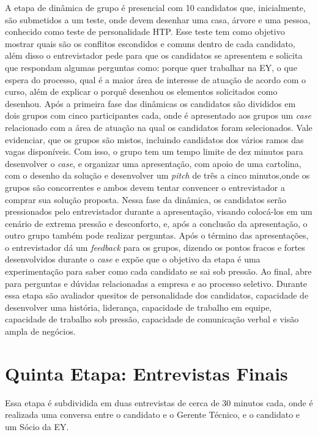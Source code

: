 A etapa de dinâmica de grupo é presencial com 10 candidatos que, inicialmente, são submetidos a um teste, onde devem desenhar uma casa, árvore e uma pessoa, conhecido como teste de personalidade HTP.
Esse teste tem como objetivo mostrar quais são os conflitos escondidos e comuns dentro de cada candidato, além disso o entrevistador pede para que os candidatos se apresentem e solicita que respondam algumas perguntas como: porque quer trabalhar na EY, o que espera do processo, qual é a maior área de interesse de atuação de acordo com o curso, além de explicar o porquê desenhou os elementos solicitados como desenhou.
Após a primeira fase das dinâmicas os candidatos são divididos em dois grupos com cinco participantes cada, onde é apresentado aos grupos um \textit{case} relacionado com a área de atuação na qual os candidatos foram selecionados. Vale evidenciar, que os grupos são mistos, incluindo candidatos dos vários ramos das vagas disponíveis.
Com isso, o grupo tem um tempo limite de dez minutos para desenvolver o \textit{case}, e organizar uma apresentação, com apoio de uma cartolina, com o desenho da solução e desenvolver um \textit{pitch} de três a cinco minutos,onde os grupos são concorrentes e ambos devem tentar convencer o entrevistador a comprar sua solução proposta. Nessa fase da dinâmica, os candidatos serão pressionados pelo entrevistador durante a apresentação, visando colocá-los em um cenário de extrema pressão e desconforto, e, após a conclusão da apresentação, o outro grupo também pode realizar perguntas.
Após o término das apresentações, o entrevistador dá um \textit{feedback} para os grupos, dizendo os pontos fracos e fortes desenvolvidos durante o \textit{case} e expõe que o objetivo da etapa é uma experimentação para saber como cada candidato se sai sob pressão.
Ao final, abre para perguntas e dúvidas relacionadas a empresa e ao processo seletivo.
Durante essa etapa são avaliador quesitos de personalidade dos candidatos, capacidade de desenvolver uma história, liderança, capacidade de trabalho em equipe, capacidade de trabalho sob pressão, capacidade de comunicação verbal e visão ampla de negócios.




\section{Quinta Etapa: Entrevistas Finais}
Essa etapa é subdividida em duas entrevistas de cerca de 30 minutos cada, onde é realizada uma conversa entre o candidato e o Gerente Técnico, e o candidato e um Sócio da EY.


